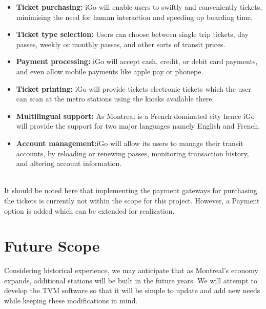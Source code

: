 \documentclass[a4paper, 11pt]{report}
\begin{document}
\begin{itemize}
  \item \textbf{Ticket purchasing:} iGo will enable users to swiftly and conveniently tickets, minimising the need for human interaction and speeding up boarding time.
  \item \textbf{Ticket type selection:} Users can choose between single trip tickets, day passes, weekly or monthly passes, and other sorts of transit prices.
  \item \textbf{Payment processing:} iGo will accept cash, credit, or debit card payments, and even allow mobile payments like apple pay or phonepe.
  \item \textbf{Ticket printing:} iGo will provide tickets electronic tickets which the user can scan at the metro stations using the kiosks available there.
  \item \textbf{Multilingual support:} As Montreal is a French dominated city hence iGo will provide the support for two major languages namely English and French.
  \item \textbf{Account management:}iGo will allow its users to manage their transit accounts, by reloading or renewing passes, monitoring transaction history, and altering account information.
\end{itemize}
\leavevmode
\\
It should be noted here that implementing the payment gateways for purchasing the tickets is currently not within the scope for this project. However, a Payment option is added which can be extended for realization.
\\


\section{Future Scope}
Considering historical experience, we may anticipate that as Montreal's economy expands, additional stations will be built in the future years.
We will attempt to develop the TVM software so that it will be simple to update and add new needs while keeping these modifications in mind. 
\end{document}
